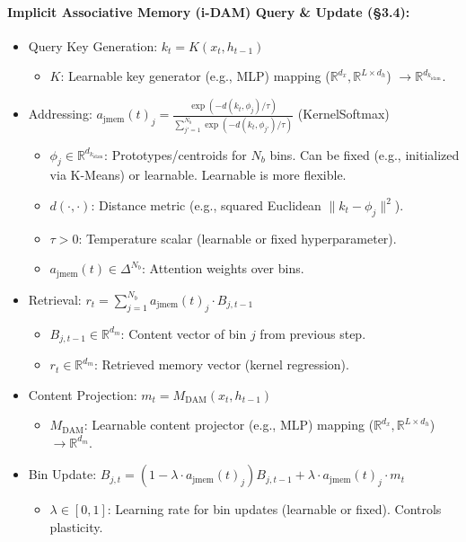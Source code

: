 \documentclass{article}
\begin{document}
\paragraph{Implicit Associative Memory (i-DAM) Query \& Update (\S3.4):}
\begin{itemize}
    \item Query Key Generation: $k_t = K(x_t, h_{t-1})$
        \begin{itemize}
        \item $K$: Learnable key generator (e.g., MLP) mapping ($\mathbb{R}^{d_x}, \mathbb{R}^{L \times d_h}$) $\to \mathbb{R}^{d_{k_{\text{idam}}}}$.
        \end{itemize}
    \item Addressing: $a_{\text{jmem}}(t)_j = \frac{\exp(-d(k_t, \phi_j)/\tau)}{\sum_{j'=1}^{N_b} \exp(-d(k_t, \phi_{j'})/\tau)}$ (KernelSoftmax)
        \begin{itemize}
        \item $\phi_j \in \mathbb{R}^{d_{k_{\text{idam}}}}$: Prototypes/centroids for $N_b$ bins. Can be fixed (e.g., initialized via K-Means) or learnable. Learnable is more flexible.
        \item $d(\cdot, \cdot)$: Distance metric (e.g., squared Euclidean $\|k_t - \phi_j\|^2$).
        \item $\tau > 0$: Temperature scalar (learnable or fixed hyperparameter).
        \item $a_{\text{jmem}}(t) \in \Delta^{N_b}$: Attention weights over bins.
        \end{itemize}
    \item Retrieval: $r_t = \sum_{j=1}^{N_b} a_{\text{jmem}}(t)_j \cdot B_{j,t-1}$
        \begin{itemize}
        \item $B_{j,t-1} \in \mathbb{R}^{d_m}$: Content vector of bin $j$ from previous step.
        \item $r_t \in \mathbb{R}^{d_m}$: Retrieved memory vector (kernel regression).
        \end{itemize}
    \item Content Projection: $m_t = M_{\text{DAM}}(x_t, h_{t-1})$
        \begin{itemize}
        \item $M_{\text{DAM}}$: Learnable content projector (e.g., MLP) mapping ($\mathbb{R}^{d_x}, \mathbb{R}^{L \times d_h}$) $\to \mathbb{R}^{d_m}$.
        \end{itemize}
    \item Bin Update: $B_{j,t} = (1 - \lambda \cdot a_{\text{jmem}}(t)_j) B_{j,t-1} + \lambda \cdot a_{\text{jmem}}(t)_j \cdot m_t$
        \begin{itemize}
        \item $\lambda \in [0, 1]$: Learning rate for bin updates (learnable or fixed). Controls plasticity.
        \end{itemize}
\end{itemize}
\end{document}
